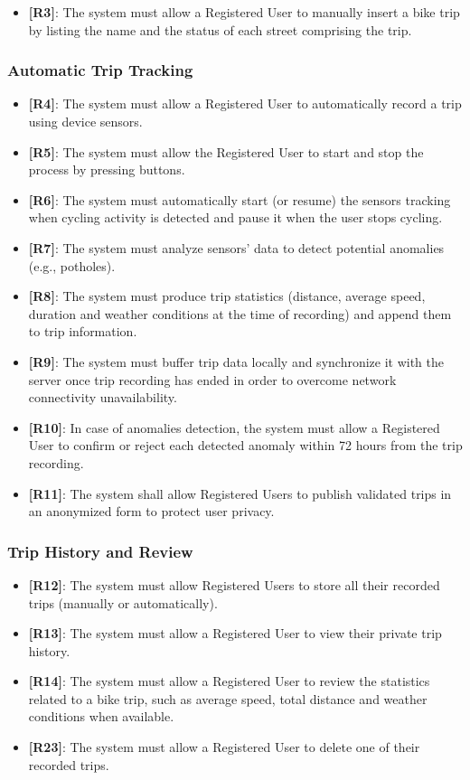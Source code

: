 \begin{itemize}
    \item \textbf{[R3]}: The system must allow a Registered User to manually insert a bike trip by listing the name and the status of each street comprising the trip.
\end{itemize}

\subsubsection{Automatic Trip Tracking}

\begin{itemize}
    \item \textbf{[R4]}: The system must allow a Registered User to automatically record a trip using device sensors.
    \item \textbf{[R5]}: The system must allow the Registered User to start and stop the process by pressing buttons.
    \item \textbf{[R6]}: The system must automatically start (or resume) the sensors tracking when cycling activity is detected and pause it when the user stops cycling.
    \item \textbf{[R7]}: The system must analyze sensors' data to detect potential anomalies (e.g., potholes).
    \item \textbf{[R8]}: The system must produce trip statistics (distance, average speed, duration and weather conditions at the time of recording) and append them to trip information.
    \item \textbf{[R9]}: The system must buffer trip data locally and synchronize it with the server once trip recording has ended in order to overcome network connectivity unavailability.
    \item \textbf{[R10]}: In case of anomalies detection, the system must allow a Registered User to confirm or reject each detected anomaly within 72 hours from the trip recording.
    \item \textbf{[R11]}: The system shall allow Registered Users to publish validated trips in an anonymized form to protect user privacy.
\end{itemize}

\subsubsection{Trip History and Review}

\begin{itemize}
    \item \textbf{[R12]}: The system must allow Registered Users to store all their recorded trips (manually or automatically).
    \item \textbf{[R13]}: The system must allow a Registered User to view their private trip history.
    \item \textbf{[R14]}: The system must allow a Registered User to review the statistics related to a bike trip, such as average speed, total distance and weather conditions when available.
    \item \textbf{[R23]}: The system must allow a Registered User to delete one of their recorded trips.
\end{itemize}

